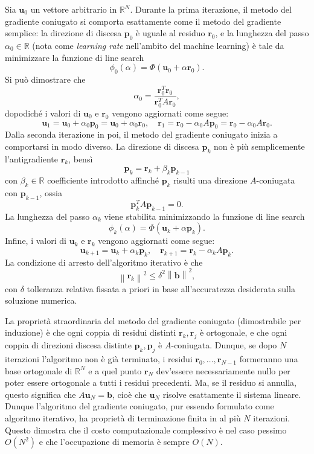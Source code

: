 \documentclass[a4paper,11pt]{article}
\renewcommand{\vec}[1]{\bm{#1}}
\newcommand{\R}{\mathbb{R}}
\newcommand{\norm}[1]{\left\lVert#1\right\rVert}
\begin{document}
Sia $\vec{u}_0$ un vettore arbitrario in $\R^N$.
Durante la prima iterazione, il metodo del gradiente
coniugato si comporta esattamente come il metodo del
gradiente semplice: la direzione di discesa $\vec{p}_0$
è uguale al residuo $\vec{r}_0$, e la lunghezza del passo
$\alpha_0 \in \R$ (nota come \emph{learning rate} nell'ambito del
machine learning) è tale da minimizzare la funzione di line search
\[
\phi_0(\alpha) = \Phi(\vec{u}_0 + \alpha \vec{r}_0).
\]
Si può dimostrare che
\[
\alpha_0 = \frac{\vec{r}_0^T \vec{r}_0}{\vec{r}_0^T A \vec{r}_0},
\]
dopodiché i valori di $\vec{u}_0$ e $\vec{r}_0$ vengono aggiornati
come segue:
\[
\vec{u}_1 = \vec{u}_0 + \alpha_0 \vec{p}_0
= \vec{u}_0 + \alpha_0 \vec{r}_0, \quad
\vec{r}_1 = \vec{r}_0 - \alpha_0 A \vec{p}_0
= \vec{r}_0 - \alpha_0 A \vec{r}_0.
\]
Dalla seconda iterazione in poi, il metodo del gradiente
coniugato inizia a comportarsi in modo diverso.
La direzione di discesa $\vec{p}_k$ non è più semplicemente
l'antigradiente $\vec{r}_k$, bensì
\[
\vec{p}_k = \vec{r}_k + \beta_k \vec{p}_{k-1}
\]
con $\beta_k \in \R$ coefficiente introdotto affinché
$\vec{p}_k$ risulti una direzione $A$-coniugata
con $\vec{p}_{k-1}$, ossia
\[
\vec{p}_k^T A \vec{p}_{k-1} = 0.
\]
La lunghezza del passo $\alpha_k$ viene stabilita minimizzando
la funzione di line search
\[
\phi_k(\alpha) = \Phi(\vec{u}_k + \alpha \vec{p}_k).
\]
Infine, i valori di $\vec{u}_k$ e $\vec{r}_k$ vengono aggiornati
come segue:
\[
\vec{u}_{k+1} = \vec{u}_k + \alpha_k \vec{p}_k, \quad
\vec{r}_{k+1} = \vec{r}_k - \alpha_k A \vec{p}_k.
\]
La condizione di arresto dell'algoritmo iterativo è che
\[
\norm{\vec{r}_k}^2 \leq \delta^2 \norm{\vec{b}}^2,
\]
con $\delta$ tolleranza relativa fissata a priori
in base all'accuratezza desiderata sulla soluzione numerica.

La proprietà straordinaria del metodo del gradiente coniugato
(dimostrabile per induzione) è che ogni coppia di residui
distinti $\vec{r}_k,\vec{r}_j$ è ortogonale, e che ogni coppia di
direzioni discesa distinte $\vec{p}_k,\vec{p}_j$ è $A$-coniugata.
Dunque, se dopo $N$ iterazioni l'algoritmo non è già
terminato, i residui $\vec{r}_0,\dots,\vec{r}_{N-1}$
formeranno una base ortogonale di $\R^N$
e a quel punto $\vec{r}_N$ dev'essere necessariamente nullo
per poter essere ortogonale a tutti i residui
precedenti. Ma, se il residuo si annulla,
questo significa che $A \vec{u}_N = \vec{b}$,
cioè che $\vec{u}_N$ risolve esattamente il sistema lineare.
Dunque l'algoritmo del gradiente coniugato, pur essendo formulato come
algoritmo iterativo, ha proprietà di terminazione finita
in al più $N$ iterazioni. Questo dimostra che il costo computazionale
complessivo è nel caso pessimo $O(N^2)$ e che l'occupazione di
memoria è sempre $O(N)$.
\end{document}
